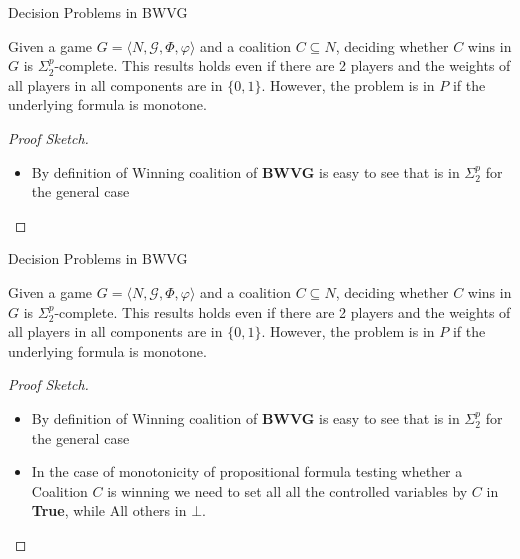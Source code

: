 \documentclass{beamer}
\begin{document}
\begin{frame}[fragile]{Decision Problems in BWVG}
  \begin{theorem3}
    Given a game $G = \langle N, \mathcal{G}, \Phi, \varphi \rangle$ and a coalition $C \subseteq N$, 
    deciding whether $C$ wins in $G$ is $\Sigma_2^p$-complete. This results holds even if there are 2 players
    and the weights of all players in all components are in $\{0,1\}$. However, the problem is in $P$ if the underlying
    formula is monotone.
  \end{theorem3}
  \begin{proof}[Proof Sketch]
    \begin{itemize}
      \item By definition of Winning coalition of \textbf{BWVG} is easy to see that is in $\Sigma_2^p$ for the general case
    \end{itemize}
  \end{proof}
\end{frame}

\begin{frame}[fragile]{Decision Problems in BWVG}
  \begin{theorem3}
    Given a game $G = \langle N, \mathcal{G}, \Phi, \varphi \rangle$ and a coalition $C \subseteq N$, 
    deciding whether $C$ wins in $G$ is $\Sigma_2^p$-complete. This results holds even if there are 2 players
    and the weights of all players in all components are in $\{0,1\}$. However, the problem is in $P$ if the underlying
    formula is monotone.
  \end{theorem3}
  \begin{proof}[Proof Sketch]
    \begin{itemize}
      \item By definition of Winning coalition of \textbf{BWVG} is easy to see that is in $\Sigma_2^p$ for the general case
      \item In the case of monotonicity of propositional formula testing whether a Coalition $C$ is winning we need to set all 
      all the controlled variables by $C$ in \textbf{True}, while All others in \textbf{$\bot$}.
    \end{itemize}
  \end{proof}
\end{frame}
\end{document}
